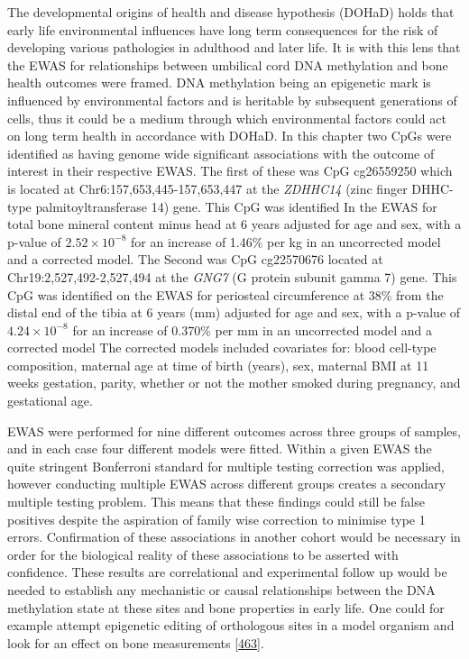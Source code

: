 \documentclass[
]{book}
\begin{document}
The developmental origins of health and disease hypothesis (DOHaD) holds that early life environmental influences have long term consequences for the risk of developing various pathologies in adulthood and later life.
It is with this lens that the EWAS for relationships between umbilical cord DNA methylation and bone health outcomes were framed.
DNA methylation being an epigenetic mark is influenced by environmental factors and is heritable by subsequent generations of cells, thus it could be a medium through which environmental factors could act on long term health in accordance with DOHaD.
In this chapter two CpGs were identified as having genome wide significant associations with the outcome of interest in their respective EWAS.
The first of these was CpG cg26559250 which is located at Chr6:157,653,445-157,653,447 at the \emph{ZDHHC14} (zinc finger DHHC-type palmitoyltransferase 14) gene.
This CpG was identified In the EWAS for total bone mineral content minus head at 6 years adjusted for age and sex, with a p-value of \(2.52\times 10^{-8}\) for an increase of 1.46\% per kg in an uncorrected model and a corrected model.
The Second was CpG cg22570676 located at Chr19:2,527,492-2,527,494 at the \emph{GNG7} (G protein subunit gamma 7) gene.
This CpG was identified on the EWAS for periosteal circumference at 38\% from the distal end of the tibia at 6 years (mm) adjusted for age and sex, with a p-value of \(4.24\times 10^{-8}\) for an increase of 0.370\% per mm in an uncorrected model and a corrected model
The corrected models included covariates for: blood cell-type composition, maternal age at time of birth (years), sex, maternal BMI at 11 weeks gestation, parity, whether or not the mother smoked during pregnancy, and gestational age.

EWAS were performed for nine different outcomes across three groups of samples, and in each case four different models were fitted.
Within a given EWAS the quite stringent Bonferroni standard for multiple testing correction was applied, however conducting multiple EWAS across different groups creates a secondary multiple testing problem.
This means that these findings could still be false positives despite the aspiration of family wise correction to minimise type 1 errors.
Confirmation of these associations in another cohort would be necessary in order for the biological reality of these associations to be asserted with confidence.
These results are correlational and experimental follow up would be needed to establish any mechanistic or causal relationships between the DNA methylation state at these sites and bone properties in early life.
One could for example attempt epigenetic editing of orthologous sites in a model organism and look for an effect on bone measurements {[}\protect\hyperlink{ref-Gjaltema2020}{463}{]}.
\end{document}
